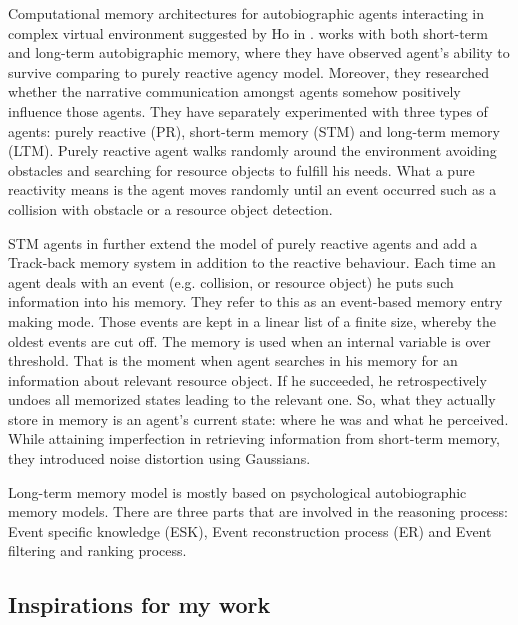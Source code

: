 Computational memory architectures for autobiographic agents interacting in complex virtual environment suggested by Ho in \cite{Ho:memoryarchitectures}. works with both short-term and long-term autobigraphic memory, where they have observed agent’s ability to survive comparing to purely reactive agency model. Moreover, they researched whether the narrative communication amongst agents somehow positively influence those agents. They have separately experimented with three types of agents: purely reactive (PR), short-term memory (STM) and long-term memory (LTM). Purely reactive agent walks randomly around the environment avoiding obstacles and searching for resource objects to fulfill his needs. What a pure reactivity means is the agent moves randomly until an event occurred such as a collision with obstacle or a resource object detection.

STM agents in \cite{Ho:memoryarchitectures} further extend the model of purely reactive agents and add a Track-back memory system in addition to the reactive behaviour. Each time an agent deals with an event (e.g. collision, or resource object) he puts such information into his memory. They refer to this as an event-based memory entry making mode. Those events are kept in a linear list of a finite size, whereby the oldest events are cut off. The memory is used when an internal variable is over threshold. That is the moment when agent searches in his memory for an information about relevant resource object. If he succeeded, he retrospectively undoes all memorized states leading to the relevant one. So, what they actually store in memory is an agent’s current state: where he was and what he perceived. While attaining imperfection in retrieving information from short-term memory, they introduced noise distortion using Gaussians.

Long-term memory model is mostly based on psychological autobiographic memory models. There are three parts that are involved in the reasoning process: Event specific knowledge (ESK), Event reconstruction process (ER) and Event filtering and ranking process.

\subsection{Inspirations for my work}




